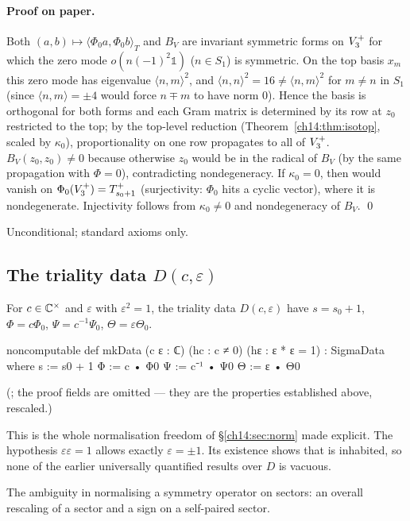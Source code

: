 \paragraph{Proof on paper.}  Both $(a,b)\mapsto\langle\Phi_0a,\Phi_0b\rangle_T$ and $B_V$ are invariant
symmetric forms on $V_3^{+}$ for which the zero mode $o(n(-1)^2\mathbb 1)$ ($n\in S_1$) is symmetric.  On the
top basis $x_m$ this zero mode has eigenvalue $\langle n,m\rangle^2$, and $\langle n,n\rangle^2=16\ne\langle n,m\rangle^2$
for $m\ne n$ in $S_1$ (since $\langle n,m\rangle=\pm4$ would force $n\mp m$ to have norm $0$).  Hence the basis is
orthogonal for both forms and each Gram matrix is determined by its row at $z_0$ restricted to the
top; by the top-level reduction (Theorem~\ref{ch14:thm:isotop}, scaled by $\kappa_0$), proportionality on
one row propagates to all of $V_3^{+}$.  $B_V(z_0,z_0)\ne0$ because otherwise $z_0$ would be in the radical
of $B_V$ (by the same propagation with $\Phi=0$), contradicting nondegeneracy.  If $\kappa_0=0$, then
 would vanish on $\Phi_0(V_3^{+})=T_{s_0+1}^+$ (surjectivity: $\Phi_0$ hits a cyclic vector), where it
is nondegenerate.  Injectivity follows from $\kappa_0\ne0$ and nondegeneracy of $B_V$. \qed

\begin{status}Unconditional; standard axioms only.\end{status}

\subsection{\texorpdfstring{The triality data $D(c,\varepsilon)$}{The triality data D(c,epsilon)}}

\begin{definition}[$D(c,\varepsilon)$]\label{ch14:def:mkData}
For $c\in{\mathbb{C}}^\times$ and $\varepsilon$ with $\varepsilon^2=1$, the triality data
$D(c,\varepsilon)$ have $s=s_0+1$, $\Phi=c\Phi_0$, $\Psi=c^{-1}\Psi_0$, $\Theta=\varepsilon\Theta_0$.
\end{definition}
\begin{leancode}
noncomputable def mkData (c ε : ℂ) (hc : c ≠ 0) (hε : ε * ε = 1) : SigmaData where
  s := s0 + 1
  Φ := c • Φ0
  Ψ := c⁻¹ • Ψ0
  Θ := ε • Θ0
\end{leancode}
(; the proof fields are omitted — they are the properties
established above, rescaled.)

\begin{dictionary}
This is the whole normalisation freedom of \S\ref{ch14:sec:norm} made explicit.  The hypothesis
$\varepsilon\varepsilon=1$ allows exactly $\varepsilon=\pm1$.  Its existence shows that 
is inhabited, so none of the earlier universally quantified results over $D$ is vacuous.
\end{dictionary}
\begin{physics}
The ambiguity in normalising a symmetry operator on sectors: an overall rescaling of a sector and a sign on a self-paired sector.
\end{physics}


